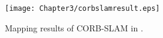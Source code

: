 \begin{figure}[H]
	\centering
	\texttt{[image: Chapter3/corbslamresult.eps]}
	\caption{Mapping results of CORB-SLAM in \cite{li2017corb}.}
	\label{fig:corbslamresult} 
\end{figure}



\newpage
